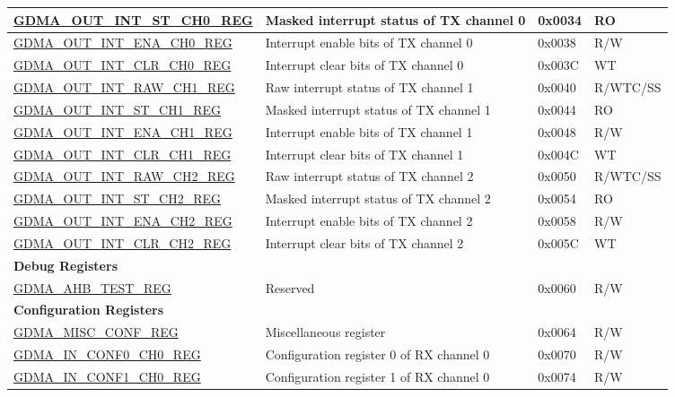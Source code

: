 \begin{longtable}{ | p{6.7cm} | p{6cm} | p{1.3cm} | p{1.5cm} | }
\hyperref[regdesc:GDMAOUTINTSTCHNREG]{GDMA\_OUT\_INT\_ST\_CH0\_REG} & Masked interrupt status of TX channel 0 & 0x0034 & RO \\ \hline
\hyperref[regdesc:GDMAOUTINTENACHNREG]{GDMA\_OUT\_INT\_ENA\_CH0\_REG} & Interrupt enable bits of TX channel 0 & 0x0038 & R/W \\ \hline
\hyperref[regdesc:GDMAOUTINTCLRCHNREG]{GDMA\_OUT\_INT\_CLR\_CH0\_REG} & Interrupt clear bits of TX channel 0 & 0x003C & WT \\ \hline
\hyperref[regdesc:GDMAOUTINTRAWCHNREG]{GDMA\_OUT\_INT\_RAW\_CH1\_REG} & Raw interrupt status of TX channel 1 & 0x0040 & R/WTC/SS \\ \hline
\hyperref[regdesc:GDMAOUTINTSTCHNREG]{GDMA\_OUT\_INT\_ST\_CH1\_REG} & Masked interrupt status of TX channel 1 & 0x0044 & RO \\ \hline
\hyperref[regdesc:GDMAOUTINTENACHNREG]{GDMA\_OUT\_INT\_ENA\_CH1\_REG} & Interrupt enable bits of TX channel 1 & 0x0048 & R/W \\ \hline
\hyperref[regdesc:GDMAOUTINTCLRCHNREG]{GDMA\_OUT\_INT\_CLR\_CH1\_REG} & Interrupt clear bits of TX channel 1 & 0x004C & WT \\ \hline
\hyperref[regdesc:GDMAOUTINTRAWCHNREG]{GDMA\_OUT\_INT\_RAW\_CH2\_REG} & Raw interrupt status of TX channel 2 & 0x0050 & R/WTC/SS \\ \hline
\hyperref[regdesc:GDMAOUTINTSTCHNREG]{GDMA\_OUT\_INT\_ST\_CH2\_REG} & Masked interrupt status of TX channel 2 & 0x0054 & RO \\ \hline
\hyperref[regdesc:GDMAOUTINTENACHNREG]{GDMA\_OUT\_INT\_ENA\_CH2\_REG} & Interrupt enable bits of TX channel 2 & 0x0058 & R/W \\ \hline
\hyperref[regdesc:GDMAOUTINTCLRCHNREG]{GDMA\_OUT\_INT\_CLR\_CH2\_REG} & Interrupt clear bits of TX channel 2 & 0x005C & WT \\ \hline
\multicolumn{4}{|l|}{\textbf{Debug Registers}} \\ \hline
\hyperref[regdesc:GDMAAHBTESTREG]{GDMA\_AHB\_TEST\_REG} & Reserved & 0x0060 & R/W \\ \hline
\multicolumn{4}{|l|}{\textbf{Configuration Registers}} \\ \hline
\hyperref[regdesc:GDMAMISCCONFREG]{GDMA\_MISC\_CONF\_REG} & Miscellaneous register & 0x0064 & R/W \\ \hline
\hyperref[regdesc:GDMAINCONF0CHNREG]{GDMA\_IN\_CONF0\_CH0\_REG} & Configuration register 0 of RX channel 0 & 0x0070 & R/W \\ \hline
\hyperref[regdesc:GDMAINCONF1CHNREG]{GDMA\_IN\_CONF1\_CH0\_REG} & Configuration register 1 of RX channel 0 & 0x0074 & R/W \\ \hline

\end{longtable}

